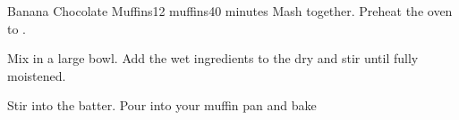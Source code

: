 \documentclass[../Cookbook.tex]{subfiles}
\begin{document}
\begin{recipe}[BananaChocolateMuffins]{Banana Chocolate Muffins}{12 muffins}{40 minutes}
	Mash together.
	Preheat the oven to .

	Mix in a large bowl.
	Add the wet ingredients to the dry and stir until fully moistened.

	Stir into the batter.
	Pour into your muffin pan and bake 
\end{recipe}
\end{document}

